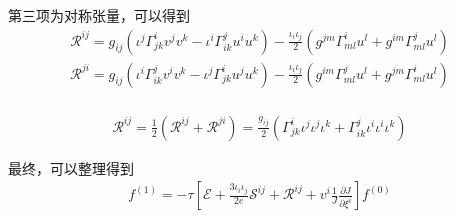 \documentclass[MathematicsNumericsDerivationsAndOpenFOAM.tex]{subfiles}
\begin{document}
第三项为对称张量，可以得到
\begin{equation}
  \begin{gathered}
    \mathcal{R}^{ij} =g_{ij} (\iota^j\Gamma_{j k}^{i} v^j v^k - \iota^i\Gamma_{i k}^{j} u^i u^k) - \frac{\iota_i\iota_j}{2}(g^{jm}\Gamma_{ml}^i u^l + g^{im}\Gamma_{ml}^j u^l) \\
    \mathcal{R}^{ji}= g_{ij} (\iota^i\Gamma_{i k}^{j} v^i v^k - \iota^j \Gamma_{j k}^{i} u^j u^k) - \frac{\iota_i\iota_j}{2}(g^{im}\Gamma_{ml}^j u^l + g^{jm}\Gamma_{ml}^i u^l) \\
  \end{gathered}
\end{equation}

\begin{equation}
  \begin{gathered}
    \mathcal{R}^{ij} = \frac{1}{2}(\mathcal{R}^{ij}+\mathcal{R}^{ji})=\frac{g_{ij}}{2}(\Gamma_{jk}^i \iota^j\iota^j\iota^k + \Gamma_{ik}^j \iota^i\iota^i\iota^k )
  \end{gathered}
\end{equation}










最终，可以整理得到
\begin{equation}
  \boxed{
    \begin{gathered}
      f^{(1)}=
      -\tau [ \mathcal{E}
        +\frac{3\iota_i \iota_j}{2e} \mathcal{S}^{ij}
        +  \mathcal{R}^{ij}  + v^i  \frac{1}{J}\frac{\partial J}{\partial \xi^i}
      ]{f^{(0)}}
    \end{gathered}
  }
\end{equation}
\end{document}
